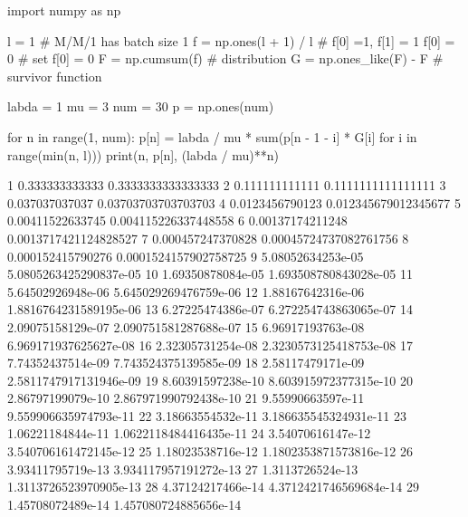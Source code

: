 
import numpy as np

l = 1 # M/M/1 has batch size 1
f = np.ones(l + 1) / l # f[0] =1, f[1] = 1 
f[0] = 0 # set f[0] = 0
F = np.cumsum(f) # distribution 
G = np.ones_like(F) - F # survivor function

labda = 1
mu = 3
num = 30
p = np.ones(num)

for n in range(1, num):
    p[n] = labda / mu * sum(p[n - 1 - i] * G[i] for i in range(min(n, l)))
    print(n, p[n], (labda / mu)**n)

1 0.333333333333 0.3333333333333333
2 0.111111111111 0.1111111111111111
3 0.037037037037 0.03703703703703703
4 0.0123456790123 0.012345679012345677
5 0.00411522633745 0.004115226337448558
6 0.00137174211248 0.0013717421124828527
7 0.000457247370828 0.00045724737082761756
8 0.000152415790276 0.0001524157902758725
9 5.08052634253e-05 5.0805263425290837e-05
10 1.69350878084e-05 1.693508780843028e-05
11 5.64502926948e-06 5.645029269476759e-06
12 1.88167642316e-06 1.8816764231589195e-06
13 6.27225474386e-07 6.272254743863065e-07
14 2.09075158129e-07 2.090751581287688e-07
15 6.96917193763e-08 6.969171937625627e-08
16 2.32305731254e-08 2.3230573125418753e-08
17 7.74352437514e-09 7.743524375139585e-09
18 2.58117479171e-09 2.5811747917131946e-09
19 8.60391597238e-10 8.603915972377315e-10
20 2.86797199079e-10 2.867971990792438e-10
21 9.55990663597e-11 9.559906635974793e-11
22 3.18663554532e-11 3.186635545324931e-11
23 1.06221184844e-11 1.0622118484416435e-11
24 3.54070616147e-12 3.540706161472145e-12
25 1.18023538716e-12 1.1802353871573816e-12
26 3.93411795719e-13 3.934117957191272e-13
27 1.3113726524e-13 1.3113726523970905e-13
28 4.37124217466e-14 4.3712421746569684e-14
29 1.45708072489e-14 1.457080724885656e-14

